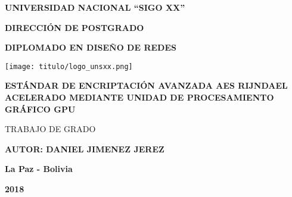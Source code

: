 \documentclass[../main/main.tex]{subfiles}
\begin{document}
  \thispagestyle{empty}
  \vspace*{-0.5cm}

  \begin{center}
    \LARGE\MakeUppercase{\textbf{Universidad Nacional ``Sigo XX''}}

    \vspace{0.5cm}
    \Large\MakeUppercase{\textbf{Dirección de Postgrado}}

    \vspace{0.5cm}
    \large\MakeUppercase{\textbf{Diplomado en Diseño de Redes}}

    \vspace{1.3cm}
    \texttt{[image: titulo/logo\_unsxx.png]}
    \vspace{1.3cm}

    \Large\MakeUppercase{\textbf{Estándar de Encriptación Avanzada AES Rijndael acelerado mediante Unidad de Procesamiento Gráfico GPU}}

    \vspace{0.4cm}
    \large\MakeUppercase{Trabajo de Grado}

    \vspace{1cm}
    \large{\MakeUppercase{\textbf{Autor: Daniel Jimenez Jerez}}}
    \vspace{1cm}

    \large{\textbf{La Paz - Bolivia}}

    \large{\textbf{2018}}
  \end{center}
\end{document}
